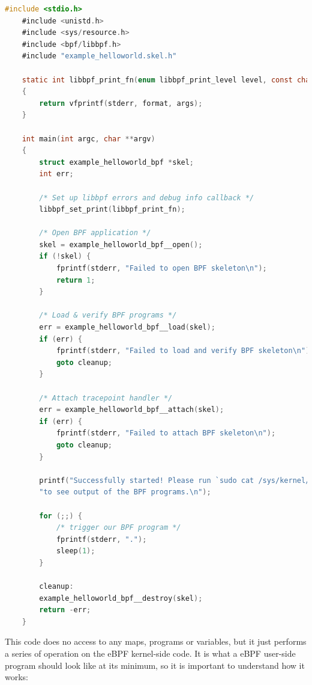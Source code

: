 \begin{lstlisting}[style=cstyle, language=C, caption={``Hello world!'' user side program using libbpf-bootstrap}, title=example\_helloworld.c]
	#include <stdio.h>
	#include <unistd.h>
	#include <sys/resource.h>
	#include <bpf/libbpf.h>
	#include "example_helloworld.skel.h"
	
	static int libbpf_print_fn(enum libbpf_print_level level, const char *format, va_list args)
	{
		return vfprintf(stderr, format, args);
	}
	
	int main(int argc, char **argv)
	{
		struct example_helloworld_bpf *skel;
		int err;
		
		/* Set up libbpf errors and debug info callback */
		libbpf_set_print(libbpf_print_fn);
		
		/* Open BPF application */
		skel = example_helloworld_bpf__open();
		if (!skel) {
			fprintf(stderr, "Failed to open BPF skeleton\n");
			return 1;
		}   
		
		/* Load & verify BPF programs */
		err = example_helloworld_bpf__load(skel);
		if (err) {
			fprintf(stderr, "Failed to load and verify BPF skeleton\n");
			goto cleanup;
		}
		
		/* Attach tracepoint handler */
		err = example_helloworld_bpf__attach(skel);
		if (err) {
			fprintf(stderr, "Failed to attach BPF skeleton\n");
			goto cleanup;
		}
		
		printf("Successfully started! Please run `sudo cat /sys/kernel/debug/tracing/trace_pipe` "
		"to see output of the BPF programs.\n");
		
		for (;;) {
			/* trigger our BPF program */
			fprintf(stderr, ".");
			sleep(1);
		}
		
		cleanup:
		example_helloworld_bpf__destroy(skel);
		return -err;
	}
\end{lstlisting}

This code does no access to any maps, programs or variables, but it just performs a series of operation on the eBPF kernel-side code.
It is what a eBPF user-side program should look like at its minimum, so it is important to understand how it works:

